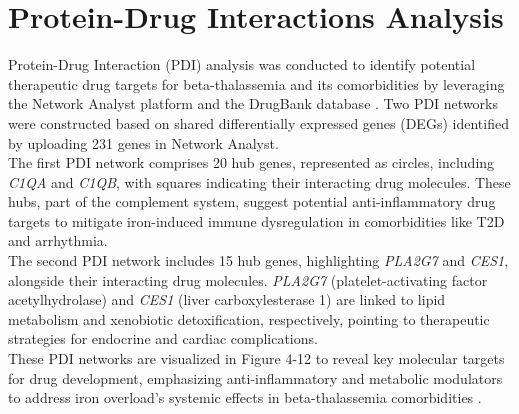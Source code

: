 \section{Protein-Drug Interactions Analysis}
\label{sec:sec4_7}

Protein-Drug Interaction (PDI) analysis was conducted to identify potential therapeutic drug targets for beta-thalassemia and its comorbidities by leveraging the Network Analyst platform and the DrugBank database \cite{8}. Two PDI networks were constructed based on shared differentially expressed genes (DEGs) identified by uploading 231 genes in Network Analyst. \\

The first PDI network comprises 20 hub genes, represented as circles, including \textit{C1QA} and \textit{C1QB}, with squares indicating their interacting drug molecules. These hubs, part of the complement system, suggest potential anti-inflammatory drug targets to mitigate iron-induced immune dysregulation in comorbidities like T2D and arrhythmia. \\

The second PDI network includes 15 hub genes, highlighting \textit{PLA2G7} and \textit{CES1}, alongside their interacting drug molecules. \textit{PLA2G7} (platelet-activating factor acetylhydrolase) and \textit{CES1} (liver carboxylesterase 1) are linked to lipid metabolism and xenobiotic detoxification, respectively, pointing to therapeutic strategies for endocrine and cardiac complications. \\

These PDI networks are visualized in Figure 4-12 to reveal key molecular targets for drug development, emphasizing anti-inflammatory and metabolic modulators to address iron overload's systemic effects in beta-thalassemia comorbidities \cite{8}. \\


